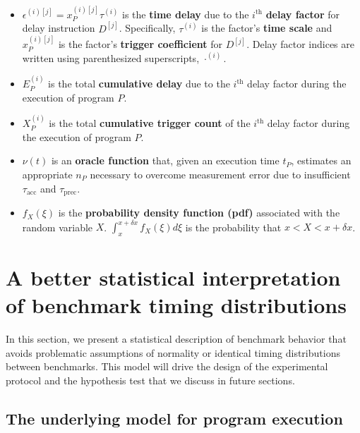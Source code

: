 \documentclass[conference]{IEEEtran}
\begin{document}
\begin{itemize}
    \item
    $\epsilon^{(i)[j]} = x_P^{(i)[j]} \tau^{(i)}$ is the \textbf{time delay} due to the
    $i^{\textrm{th}}$ \textbf{delay factor} for delay instruction $D^{[j]}$.  Specifically,
    $\tau^{(i)}$ is the factor's \textbf{time scale} and $x_P^{(i)[j]}$ is the factor's
    \textbf{trigger coefficient} for $D^{[j]}$. Delay factor indices are written using
    parenthesized superscripts, $\cdot^{(i)}$.

    \item
    $E_P^{(i)}$ is the total \textbf{cumulative delay} due to the $i^{\textrm{th}}$ delay
    factor during the execution of program $P$.

    \item
    $X^{(i)}_P$ is the total \textbf{cumulative trigger count} of the $i^{\textrm{th}}$
    delay factor during the execution of program $P$.

    \item
    $\nu(t)$ is an \textbf{oracle function} that, given an execution time $t_P$, estimates
    an appropriate $n_P$ necessary to overcome measurement error due to insufficient
    $\tau_{\textrm{acc}}$ and $\tau_{\textrm{prec}}$.

    \item
    $f_X(\xi)$ is the \textbf{probability density function (pdf)} associated with the random
    variable $X$. $\int_{x}^{x+\delta x} f_X(\xi) d\xi$ is the probability that $x < X <
    x+\delta x$.
\end{itemize}

\label{sec:model}
\section{A better statistical interpretation of benchmark timing distributions}

In this section, we present a statistical description of benchmark behavior that avoids
problematic assumptions of normality or identical timing distributions between benchmarks.
This model will drive the design of the experimental protocol and the hypothesis test
that we discuss in future sections.

\subsection{The underlying model for program execution}
\end{document}
